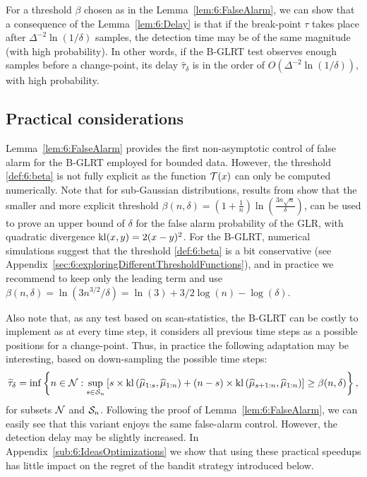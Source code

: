 For a threshold $\beta$ chosen as in the Lemma~\ref{lem:6:FalseAlarm}, we can show that a consequence of the Lemma~\ref{lem:6:Delay} is that if the break-point $\tau$ takes place after $\Delta^{-2} \ln(1/\delta)$ samples, the detection time may be of the same magnitude (with high probability).
%
In other words, if the B-GLRT test observes enough samples before a change-point,
its delay $\widehat{\tau}_\delta$ is in the order of $O(\Delta^{-2} \ln(1/\delta))$, with high probability.


\subsection{Practical considerations}\label{sub:6:PracticalConsiderations}

Lemma~\ref{lem:6:FalseAlarm} provides the first non-asymptotic control of false alarm for the B-GLRT employed for bounded data. However, the threshold \eqref{def:6:beta} is not fully explicit as the function $\mathcal{T}(x)$ can only be computed numerically.
Note that for sub-Gaussian distributions, results from \cite{Maillard2018GLR} show that the smaller and more explicit threshold
$\beta(n,\delta) = \left(1 + \frac{1}{n}\right)\ln\left(\frac{3n\sqrt{n}}{\delta}\right)$,
can be used to prove an upper bound of $\delta$ for the false alarm probability of the GLR, with quadratic divergence $\mathrm{kl}(x,y)=2(x-y)^2$.
%
For the B-GLRT, numerical simulations suggest that the threshold \eqref{def:6:beta} is a bit conservative (see Appendix~\ref{sec:6:exploringDifferentThresholdFunctions}), and in practice we recommend to keep only the leading term and use $\beta(n,\delta) = \ln(3n^{3/2}/\delta) = \ln(3) + 3/2\log(n) - \log(\delta)$.

Also note that, as any test based on scan-statistics, the B-GLRT can be costly to implement as at every time step, it considers all previous time steps as a possible positions for a change-point. Thus, in practice the following adaptation may be interesting, based on down-sampling the possible time steps:
%
\begin{equation}\label{def:6:GLRTricks}
    \widetilde{\tau}_{\delta} = \inf \left\{ n \in \mathcal{N} : \sup_{s \in \mathcal{S}_n} \left[s \times \mathrm{kl}\left(\widehat{\mu}_{1:s},\widehat{\mu}_{1:n}\right) + (n-s) \times \mathrm{kl}\left(\widehat{\mu}_{s+1:n},\widehat{\mu}_{1:n}\right)\right] \geq \beta(n,\delta)\right\},
\end{equation}
%
for subsets $\mathcal{N}$ and $\mathcal{S}_n$. Following the proof of Lemma~\ref{lem:6:FalseAlarm}, we can easily see that this variant enjoys the same false-alarm control.
However, the detection delay may be slightly increased.
In Appendix~\ref{sub:6:IdeasOptimizations} we show that using these practical speedups
has little impact on the regret of the bandit strategy introduced below.



